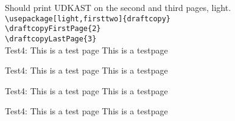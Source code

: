 \documentclass[a4paper,danish]{article}
\newcommand{\xx}{
Test4: This is a test page \thepage \vfill
This is a testpage \thepage \newpage
}
\begin{document}
Should print UDKAST on the second and third pages, light.\\
\verb|\usepackage[light,firsttwo]{draftcopy}|\\
\verb|\draftcopyFirstPage{2}|\\
\verb|\draftcopyLastPage{3}|\\
\xx\xx\xx\xx
\end{document}
